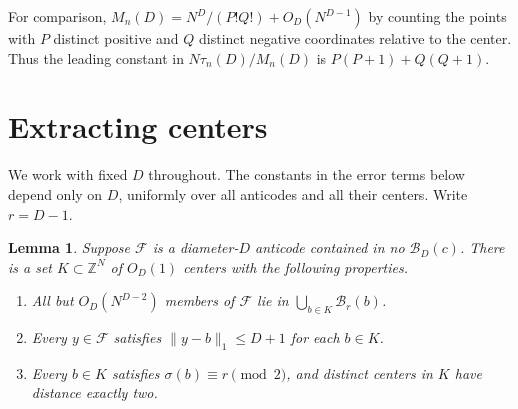\documentclass[10pt]{article}
\newtheorem{lemma}[theorem]{Lemma}
\newcommand{\Z}{\mathbb Z}
\newcommand{\F}{\mathcal F}
\newcommand{\s}{\sigma}
\newcommand{\B}{\mathcal B}
\newcommand{\norm}[1]{\lVert #1\rVert_1}
\begin{document}
For comparison, $M_n(D)=N^D/(P!Q!)+O_D(N^{D-1})$ by counting the points with $P$ distinct positive and $Q$ distinct negative coordinates relative to the center. Thus the leading constant in $N\tau_n(D)/M_n(D)$ is $P(P+1)+Q(Q+1)$.

\section{Extracting centers}

We work with fixed $D$ throughout. The constants in the error terms below depend only on $D$, uniformly over all anticodes and all their centers. Write $r=D-1$.

\begin{lemma}\label{core}
Suppose $\F$ is a diameter-$D$ anticode contained in no $\B_D(c)$. There is a set $K\subset\Z^N$ of $O_D(1)$ centers with the following properties.
\begin{enumerate}
\item All but $O_D(N^{D-2})$ members of $\F$ lie in $\bigcup_{b\in K}\B_r(b)$.
\item Every $y\in\F$ satisfies $\norm{y-b}\le D+1$ for each $b\in K$.
\item Every $b\in K$ satisfies $\s(b)\equiv r\pmod2$, and distinct centers in $K$ have distance exactly two.
\end{enumerate}
\end{lemma}
\end{document}
